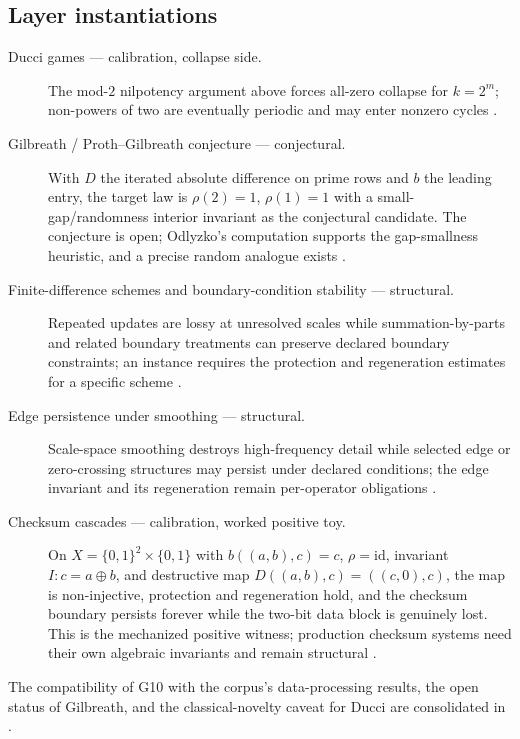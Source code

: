 \documentclass[11pt]{article}
\theoremstyle{definition}
\begin{document}
\subsection*{Layer instantiations}\label{layer-inst:G10}
\begin{description}
  \item[Ducci games --- calibration, collapse side.] The mod-$2$ nilpotency argument above forces
    all-zero collapse for $k = 2^m$; non-powers of two are eventually periodic and may enter nonzero
    cycles \citep{ChamberlandThomas2004,Breuer2007a,Breuer2007b}.
  \item[Gilbreath / Proth--Gilbreath conjecture --- conjectural.] With $D$ the iterated absolute
    difference on prime rows and $b$ the leading entry, the target law is $\rho(2) = 1$, $\rho(1) = 1$
    with a small-gap/randomness interior invariant as the conjectural candidate. The conjecture is
    open; Odlyzko's computation supports the gap-smallness heuristic, and a precise random analogue
    exists \citep{Odlyzko1993,Chase2020}.
  \item[Finite-difference schemes and boundary-condition stability --- structural.] Repeated updates
    are lossy at unresolved scales while summation-by-parts and related boundary treatments can
    preserve declared boundary constraints; an instance requires the protection and regeneration
    estimates for a specific scheme \citep{Strikwerda,GustafssonKreissOliger,CoulombelFaye}.
  \item[Edge persistence under smoothing --- structural.] Scale-space smoothing destroys
    high-frequency detail while selected edge or zero-crossing structures may persist under declared
    conditions; the edge invariant and its regeneration remain per-operator obligations
    \citep{Canny1986,Witkin1983}.
  \item[Checksum cascades --- calibration, worked positive toy.] On $X = \{0,1\}^2 \times \{0,1\}$
    with $b((a,b),c) = c$, $\rho = \mathrm{id}$, invariant $I : c = a \oplus b$, and destructive map
    $D((a,b),c) = ((c,0),c)$, the map is non-injective, protection and regeneration hold, and the
    checksum boundary persists forever while the two-bit data block is genuinely lost. This is the
    mechanized positive witness; production checksum systems need their own algebraic invariants and
    remain structural \citep{Fletcher1982,StoneEtAl1998}.
\end{description}

The compatibility of G10 with the corpus's data-processing results, the open status of Gilbreath, and
the classical-novelty caveat for Ducci are consolidated in .
\end{document}
